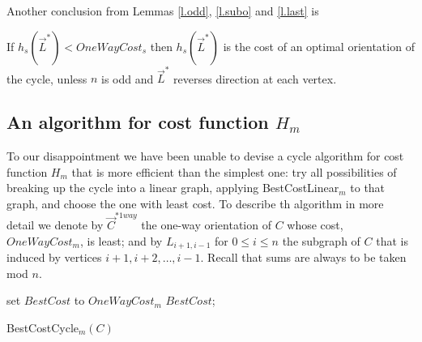 Another conclusion from Lemmas \ref{l.odd}, \ref{l.subo} and \ref{l.last} is
\begin{corollary}
	If $h_s(\vec{L}^*) < OneWayCost_s$ then $h_s(\vec{L}^*)$ is the cost of an optimal orientation of the cycle, unless $n$ is odd and $\vec{L}^*$ reverses direction at each vertex.
\end{corollary}

\subsection{An algorithm for cost function $H_m$}\label{s.c}

To our disappointment we have been unable to devise a cycle algorithm for cost function $H_m$ that 
is more efficient than the simplest one: 
try all possibilities of breaking up the cycle into a linear graph, applying 
BestCostLinear$_m$ to that graph, and choose the one with least cost. 
To describe th algorithm in more detail 
we denote by $\vec{C}^{*1way}$ the one-way orientation of $C$
whose cost, ${OneWayCost_m}$, is least; and by $L_{i+1,i-1}$ for $0\leq i \leq n$ 
the subgraph of $C$
that is induced by vertices $i+1,i+2,\ldots, i-1$. Recall that sums are 
always to be taken mod $n$.
\begin{algorithm}
set $BestCost$ to $OneWayCost_m$
\;
	\label{ac.i1} 
	\Return $BestCost$; 
	\caption{BestCostCycle$_m(C)$}
	\label{algo:oc-m}
\end{algorithm}

